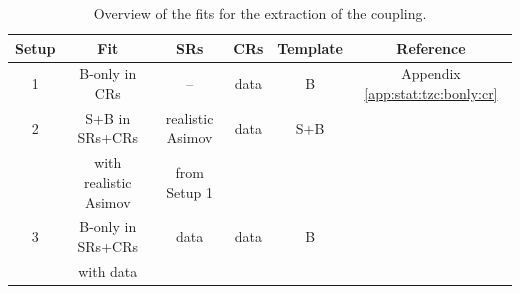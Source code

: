 \begin{table}[htbp]
	\small
	\centering
	\begin{tabular}{cccccc}
		\toprule
		Setup & Fit & SRs & CRs & Template & Reference \\
		\midrule
		1 & B-only in CRs & -- & data & B  & Appendix \ref{app:stat:tzc:bonly:cr} \\
		\midrule
		2 & S+B in SRs+CRs & realistic Asimov & data & S+B  & \Cref{sec:stat:tzc:splusb:crsr} \\
		& with realistic Asimov & from Setup 1 & & & \\
		\midrule
		3 & B-only in SRs+CRs & data & data & B  & \Cref{sec:stat:tzc:unb} \\
		& with data & & & & \\
		\bottomrule
	\end{tabular}
	\caption{
	Overview of the fits for the extraction of the \tZc coupling.}%
\label{tab:summary_fits}
\end{table}


